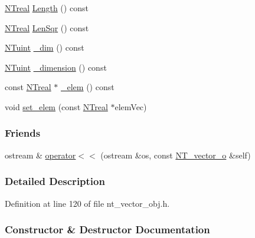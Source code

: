 \begin{DoxyCompactItemize}
\item 
\hyperlink{nt__types_8h_a814a97893e9deb1eedcc7604529ba80d}{NTreal} \hyperlink{class_n_t__vector__o_a52fdac4cc8f6aed6b81b2da288565c0a}{Length} () const 
\item 
\hyperlink{nt__types_8h_a814a97893e9deb1eedcc7604529ba80d}{NTreal} \hyperlink{class_n_t__vector__o_a508181d204c242d685a475160f035340}{LenSqr} () const 
\item 
\hyperlink{nt__types_8h_ac503559f358539d91155f135ee7a365d}{NTuint} \hyperlink{class_n_t__vector__o_a4dd8870c6854bd42b0f2a8e7b99a77ef}{\_\-dim} () const 
\item 
\hyperlink{nt__types_8h_ac503559f358539d91155f135ee7a365d}{NTuint} \hyperlink{class_n_t__vector__o_a97b1a99f924992500c54fc7daaef9f28}{\_\-dimension} () const 
\item 
const \hyperlink{nt__types_8h_a814a97893e9deb1eedcc7604529ba80d}{NTreal} $\ast$ \hyperlink{class_n_t__vector__o_a94623a8218cd1beac3cb5780e1b47d91}{\_\-elem} () const 
\item 
void \hyperlink{class_n_t__vector__o_a2fcbc3729823d14524ef580cae9045c7}{set\_\-elem} (const \hyperlink{nt__types_8h_a814a97893e9deb1eedcc7604529ba80d}{NTreal} $\ast$elemVec)
\end{DoxyCompactItemize}
\subsubsection*{Friends}
\begin{DoxyCompactItemize}
\item 
ostream \& \hyperlink{class_n_t__vector__o_ac6ba102d6a5919b05d3bfdda42462560}{operator$<$$<$} (ostream \&os, const \hyperlink{class_n_t__vector__o}{NT\_\-vector\_\-o} \&self)
\end{DoxyCompactItemize}


\subsubsection{Detailed Description}


Definition at line 120 of file nt\_\-vector\_\-obj.h.



\subsubsection{Constructor \& Destructor Documentation}
